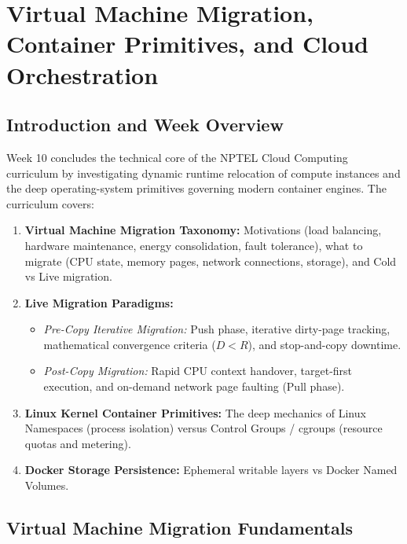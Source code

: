 \chapter{Virtual Machine Migration, Container Primitives, and Cloud Orchestration}

\section{Introduction and Week Overview}
Week 10 concludes the technical core of the NPTEL Cloud Computing curriculum by investigating dynamic runtime relocation of compute instances and the deep operating-system primitives governing modern container engines. The curriculum covers:
\begin{enumerate}[leftmargin=*]
  \item \textbf{Virtual Machine Migration Taxonomy:} Motivations (load balancing, hardware maintenance, energy consolidation, fault tolerance), what to migrate (CPU state, memory pages, network connections, storage), and Cold vs Live migration.
  \item \textbf{Live Migration Paradigms:}
    \begin{itemize}
      \item \emph{Pre-Copy Iterative Migration:} Push phase, iterative dirty-page tracking, mathematical convergence criteria ($D < R$), and stop-and-copy downtime.
      \item \emph{Post-Copy Migration:} Rapid CPU context handover, target-first execution, and on-demand network page faulting (Pull phase).
    \end{itemize}
  \item \textbf{Linux Kernel Container Primitives:} The deep mechanics of Linux Namespaces (process isolation) versus Control Groups / cgroups (resource quotas and metering).
  \item \textbf{Docker Storage Persistence:} Ephemeral writable layers vs Docker Named Volumes.
\end{enumerate}

\section{Virtual Machine Migration Fundamentals}
